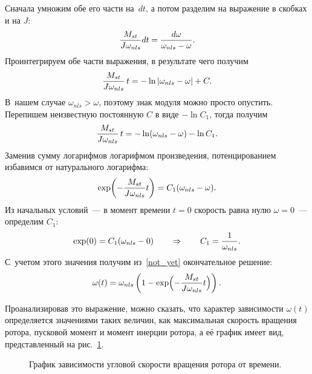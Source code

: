 \documentclass[12pt,a4paper,openany]{extarticle}
\begin{document}
Сначала умножим обе его части на~$dt$, а потом разделим на выражение в скобках и на $J$:
\begin{equation}
	\frac{M_{st}}{J\omega_{nls}}dt=\frac{d\omega}{\omega_{nls}-\omega}\ldotp
\end{equation}
Проинтегрируем обе части выражения, в результате чего получим
\begin{equation}
	\frac{M_{st}}{J\omega_{nls}}\,t=-\ln |\omega_{nls}-\omega|+C\ldotp
\end{equation}
В~нашем случае $\omega_{nls}>\omega$, поэтому знак модуля можно просто опустить. 
Перепишем неизвестную постоянную $C$ в виде $-\ln C_1$, тогда получим
\begin{equation}
	\frac{M_{st}}{J\omega_{nls}}\,t=-\ln(\omega_{nls}-\omega)-\ln C_1\ldotp
\end{equation}
Заменив сумму логарифмов логарифмом произведения, потенцированием избавимся от натурального логарифма:
\begin{equation}\label{not_yet}
	\exp\!\left(-\frac{M_{st}}{J\omega_{nls}}t\right)=C_1(\omega_{nls}-\omega)\ldotp
\end{equation}
Из начальных условий~--- в момент времени $t=0$ скорость равна нулю $\omega=0$~--- определим $C_1$:
\begin{equation}
	\exp(0)=C_1(\omega_{nls}-0) \qquad \Rightarrow \qquad C_1=\frac{1}{\omega_{nls}}\ldotp
\end{equation}
С~учетом этого значения получим из~\eqref{not_yet} окончательное решение:
\begin{equation}\label{w(t)}
	\omega(t)=\omega_{nls}\left(1-\exp\Bigl(-\frac{M_{st}}{J\omega_{nls}}t\Bigr)\right)\ldotp
\end{equation}

Проанализировав это выражение, можно сказать, что характер зависимости $\omega(t)$ определяется значениями таких величин, как максимальная скорость вращения ротора, пусковой момент и момент инерции ротора, а её график имеет вид, представленный на рис.~\ref{graph_w(t)}. 

\begin{figure}[h]
	\noindent{}
	\caption{График зависимости угловой скорости вращения ротора от времени.}
	\label{graph_w(t)}
\end{figure}
\end{document}
